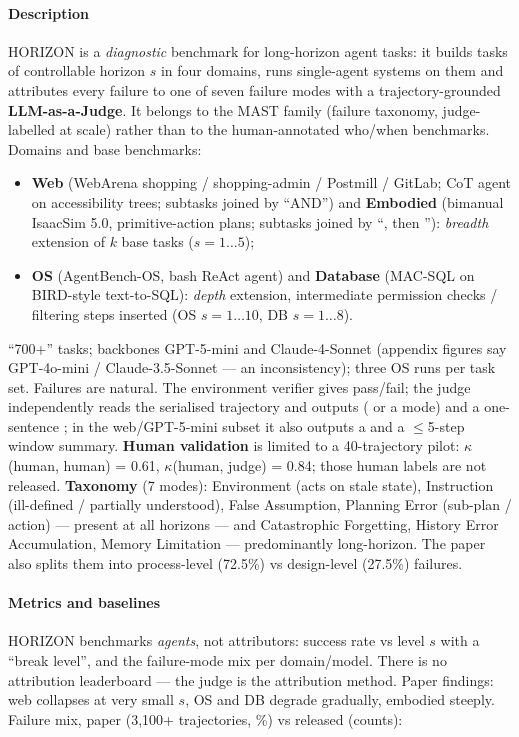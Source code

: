 \paragraph{Description} HORIZON is a \emph{diagnostic} benchmark for long-horizon agent tasks: it builds tasks of controllable horizon $s$ in four domains, runs single-agent systems on them and attributes every failure to one of seven failure modes with a trajectory-grounded \textbf{LLM-as-a-Judge}. It belongs to the MAST family (failure taxonomy, judge-labelled at scale) rather than to the human-annotated who/when benchmarks. Domains and base benchmarks:
\begin{itemize}
\item \textbf{Web} (WebArena shopping / shopping-admin / Postmill / GitLab; CoT agent on accessibility trees; subtasks joined by ``AND'') and \textbf{Embodied} (bimanual IsaacSim 5.0, primitive-action plans; subtasks joined by ``, then ''): \emph{breadth} extension of $k$ base tasks ($s{=}1\ldots5$);
\item \textbf{OS} (AgentBench-OS, bash ReAct agent) and \textbf{Database} (MAC-SQL on BIRD-style text-to-SQL): \emph{depth} extension, intermediate permission checks / filtering steps inserted (OS $s{=}1\ldots10$, DB $s{=}1\ldots8$).
\end{itemize}
``700+'' tasks; backbones GPT-5-mini and Claude-4-Sonnet (appendix figures say GPT-4o-mini / Claude-3.5-Sonnet --- an inconsistency); three OS runs per task set. Failures are natural. The environment verifier gives pass/fail; the judge independently reads the serialised trajectory and outputs  ( or a mode) and a one-sentence ; in the web/GPT-5-mini subset it also outputs a  and a $\le$5-step window summary. \textbf{Human validation} is limited to a 40-trajectory pilot: $\kappa$(human, human) = 0.61, $\kappa$(human, judge) = 0.84; those human labels are not released. \textbf{Taxonomy} (7 modes): Environment (acts on stale state), Instruction (ill-defined / partially understood), False Assumption, Planning Error (sub-plan / action) --- present at all horizons --- and Catastrophic Forgetting, History Error Accumulation, Memory Limitation --- predominantly long-horizon. The paper also splits them into process-level (72.5\%) vs design-level (27.5\%) failures.

\paragraph{Metrics and baselines} HORIZON benchmarks \emph{agents}, not attributors: success rate vs level $s$ with a ``break level'', and the failure-mode mix per domain/model. There is no attribution leaderboard --- the judge is the attribution method. Paper findings: web collapses at very small $s$, OS and DB degrade gradually, embodied steeply. Failure mix, paper (3,100+ trajectories, \%) vs released  (counts):

